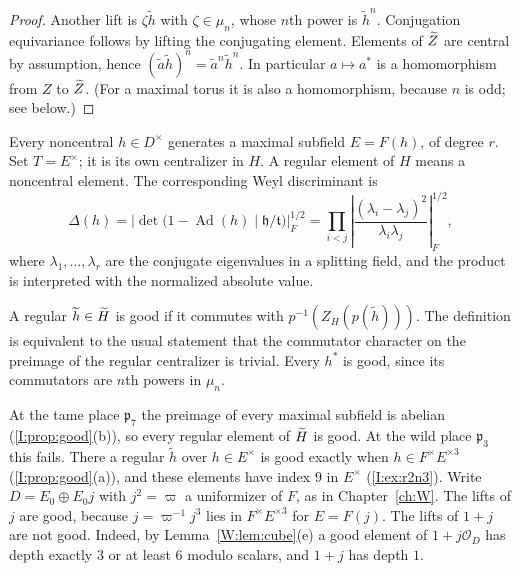 \begin{proof}
Another lift is $\zeta\widetilde h$ with $\zeta\in\mu_n$, whose $n$th power is $\widetilde h^n$. Conjugation equivariance follows by lifting the conjugating element. Elements of $\widetilde Z$ are central by assumption, hence $(\widetilde a\widetilde h)^n=\widetilde a^n\widetilde h^n$. In particular $a\mapsto a^*$ is a homomorphism from $Z$ to $\widetilde Z$. (For a maximal torus it is also a homomorphism, because $n$ is odd; see below.)
\end{proof}

Every noncentral $h\in D^\times$ generates a maximal subfield $E=F(h)$, of degree $r$. Set $T=E^\times$; it is its own centralizer in $H$. A regular element of $H$ means a noncentral element. The corresponding Weyl discriminant is
\begin{equation}\label{III:eq:disc}
\Delta(h)=\left|\det\bigl(1-\operatorname{Ad}(h)\mid \mathfrak h/\mathfrak t\bigr)\right|_F^{1/2}
=\prod_{i<j}\left|\frac{(\lambda_i-\lambda_j)^2}{\lambda_i\lambda_j}\right|_F^{1/2},
\end{equation}
where $\lambda_1,\dots,\lambda_r$ are the conjugate eigenvalues in a splitting field, and the product is interpreted with the normalized absolute value.

\begin{definition}\label{III:def:good}
A regular $\widetilde h\in\widetilde H$ is good if it commutes with $p^{-1}(Z_H(p(\widetilde h)))$. The definition is equivalent to the usual statement that the commutator character on the preimage of the regular centralizer is trivial. Every $h^*$ is good, since its commutators are $n$th powers in $\mu_n$.
\end{definition}

\begin{example}\label{III:ex:good}
At the tame place $\mathfrak p_7$ the preimage of every maximal subfield is abelian (\cref{I:prop:good}(b)), so every regular element of $\widetilde H$ is good. At the wild place $\mathfrak p_3$ this fails. There a regular $\widetilde h$ over $h\in E^\times$ is good exactly when $h\in F^\times E^{\times3}$ (\cref{I:prop:good}(a)), and these elements have index $9$ in $E^\times$ (\cref{I:ex:r2n3}). Write $D=E_0\oplus E_0j$ with $j^2=\varpi$ a uniformizer of $F$, as in Chapter~\ref{ch:W}. The lifts of $j$ are good, because $j=\varpi^{-1}j^3$ lies in $F^\times E^{\times3}$ for $E=F(j)$. The lifts of $1+j$ are not good. Indeed, by Lemma~\ref{W:lem:cube}(e) a good element of $1+j\mathcal O_D$ has depth exactly $3$ or at least $6$ modulo scalars, and $1+j$ has depth $1$.
\end{example}



